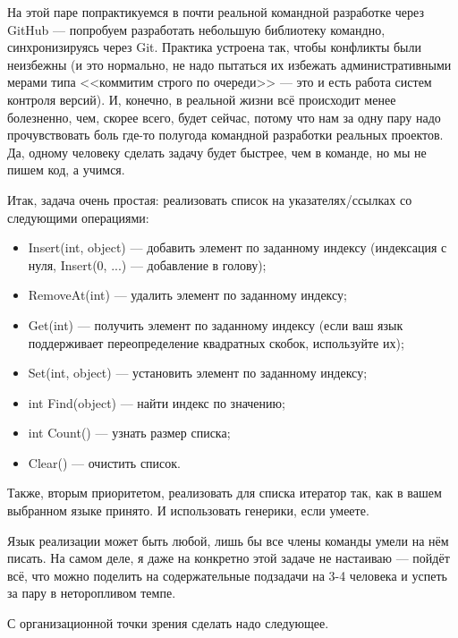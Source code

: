 \documentclass{../text-style}
\begin{document}
\maketitle
\thispagestyle{empty}

На этой паре попрактикуемся в почти реальной командной разработке через GitHub --- попробуем разработать небольшую библиотеку командно, синхронизируясь через Git. Практика устроена так, чтобы конфликты были неизбежны (и это нормально, не надо пытаться их избежать административными мерами типа <<коммитим строго по очереди>> --- это и есть работа систем контроля версий). И, конечно, в реальной жизни всё происходит менее болезненно, чем, скорее всего, будет сейчас, потому что нам за одну пару надо прочувствовать боль где-то полугода командной разработки реальных проектов. Да, одному человеку сделать задачу будет быстрее, чем в команде, но мы не пишем код, а учимся.

Итак, задача очень простая: реализовать список на указателях/ссылках со следующими операциями:
\begin{itemize}
    \item Insert(int, object) --- добавить элемент по заданному индексу (индексация с нуля, Insert(0, ...) --- добавление в голову);
    \item RemoveAt(int) --- удалить элемент по заданному индексу;
    \item Get(int) --- получить элемент по заданному индексу (если ваш язык поддерживает переопределение квадратных скобок, используйте их);
    \item Set(int, object) --- установить элемент по заданному индексу;
    \item int Find(object) --- найти индекс по значению;
    \item int Count() --- узнать размер списка;
    \item Clear() --- очистить список.
\end{itemize}

Также, вторым приоритетом, реализовать для списка итератор так, как в вашем выбранном языке принято. И использовать генерики, если умеете.

Язык реализации может быть любой, лишь бы все члены команды умели на нём писать. На самом деле, я даже на конкретно этой задаче не настаиваю --- пойдёт всё, что можно поделить на содержательные подзадачи на 3-4 человека и успеть за пару в неторопливом темпе.

С организационной точки зрения сделать надо следующее.
\end{document}
